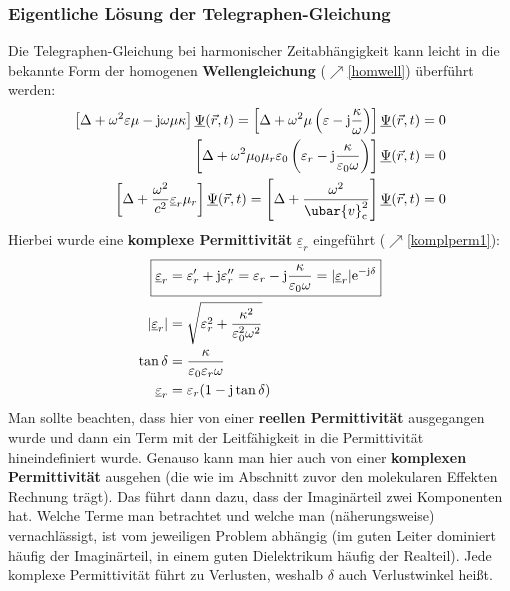  \subsubsection{Eigentliche Lösung der Telegraphen-Gleichung}
		  Die Telegraphen-Gleichung bei harmonischer Zeitabhängigkeit kann leicht in die bekannte Form der homogenen \textbf{Wellengleichung} ($\nearrow$\ref{homwell}) überführt werden:
		        \begin{equation}\begin{split}
				        \left[ \Delta + \omega^2\varepsilon\mu - \mathrm{j}\omega\mu\kappa \right] \underline{\Psi}(\vec{r} , t) =\left[ \Delta + \omega^2\mu\left(\varepsilon - \mathrm{j}\frac{\kappa}{\omega}\right) \right] \underline{\Psi}(\vec{r} , t) &=0\\
				        \left[ \Delta + \omega^2\mu_0\mu_r\varepsilon_0\left(\varepsilon_r - \mathrm{j}\frac{\kappa}{\varepsilon_0\omega}\right) \right] \underline{\Psi}(\vec{r} , t) &=0\\
				        \left[ \Delta + \frac{\omega^2}{c^2}\underline{\varepsilon}_r\mu_r\right] \underline{\Psi}(\vec{r} , t) = \left[ \Delta + \frac{\omega^2}{ \ubar{v}_\mathrm{c}^2}\right] \underline{\Psi}(\vec{r} , t)&=0
			        \end{split}\end{equation}
		 Hierbei wurde eine \textbf{komplexe Permittivität} \(\underline{\varepsilon}_r\) eingeführt ($\nearrow$\ref{komplperm1}):
		        \begin{equation}\begin{split}
			        \Aboxed{\underline{\varepsilon}_r &= \varepsilon_r^{\prime} + \mathrm{j}\varepsilon_r^{\prime\prime} = \varepsilon_r - \mathrm{j}\frac{\kappa}{\varepsilon_0\omega} = |\underline{\varepsilon}_r|  \mathrm{e}^{-\mathrm{j}\delta}} \\ |\underline{\varepsilon}_r|&=\sqrt{\varepsilon_r^2+\frac{\kappa^2}{\varepsilon_0^2\omega^2}} \\
			        \tan\delta &= \frac{\kappa}{\varepsilon_0\varepsilon_r\omega} \\
			        \underline{\varepsilon}_r &=\varepsilon_r (1 - \mathrm{j}\tan\delta)
		        \end{split}\end{equation}
		        Man sollte beachten, dass hier von einer \textbf{reellen Permittivität} ausgegangen wurde und dann ein Term mit der Leitfähigkeit in die Permittivität hineindefiniert wurde. Genauso kann man hier auch von einer \textbf{komplexen Permittivität} ausgehen (die wie im Abschnitt zuvor den molekularen Effekten Rechnung trägt). Das führt dann dazu, dass der Imaginärteil zwei Komponenten hat. Welche Terme man betrachtet und welche man (näherungsweise) vernachlässigt, ist vom jeweiligen Problem abhängig (im guten Leiter dominiert häufig der Imaginärteil, in einem guten Dielektrikum häufig der Realteil). Jede komplexe Permittivität führt zu Verlusten, weshalb $\delta$ auch Verlustwinkel heißt.\\
